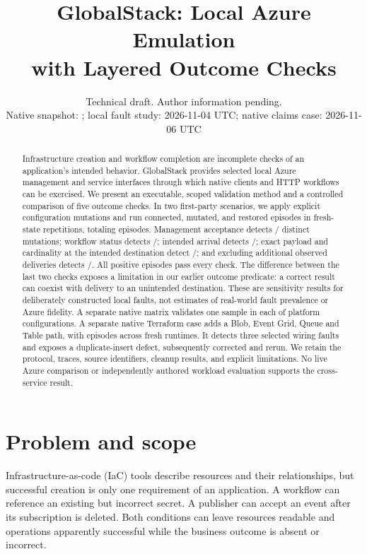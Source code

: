 \documentclass[10pt,a4paper]{article}
\title{\color{ink}GlobalStack: Local Azure Emulation\protect\\with Layered Outcome Checks}
\author{}
\date{Technical draft. Author information pending.\\Native snapshot: \SnapshotDate; local fault study: 2026-11-04 UTC; native claims case: 2026-11-06 UTC}
\begin{document}
\maketitle
\begin{abstract}
Infrastructure creation and workflow completion are incomplete checks of an application's intended behavior. GlobalStack provides selected local Azure management and service interfaces through which native clients and HTTP workflows can be exercised. We present an executable, scoped validation method and a controlled comparison of five outcome checks. In two first-party scenarios, we apply \StudyCases{} explicit configuration mutations and run connected, mutated, and restored episodes in \StudyRepetitions{} fresh-state repetitions, totaling \StudyEpisodes{} episodes. Management acceptance detects \StudyManagementCaught{}/\StudyCases{} distinct mutations; workflow status detects \StudyWorkflowCaught{}/\StudyCases{}; intended arrival detects \StudyArrivalCaught{}/\StudyCases{}; exact payload and cardinality at the intended destination detect \StudyExactCaught{}/\StudyCases{}; and excluding additional observed deliveries detects \StudyExclusiveCaught{}/\StudyCases{}. All \StudyPositives{} positive episodes pass every check. The difference between the last two checks exposes a limitation in our earlier outcome predicate: a correct result can coexist with delivery to an unintended destination. These are sensitivity results for deliberately constructed local faults, not estimates of real-world fault prevalence or Azure fidelity. A separate native matrix validates one sample in each of \NativeCount{} platform configurations. A separate native Terraform case adds a Blob, Event Grid, Queue and Table path, with \ClaimsEpisodes{} episodes across \ClaimsRepetitions{} fresh runtimes. It detects three selected wiring faults and exposes a duplicate-insert defect, subsequently corrected and rerun. We retain the protocol, traces, source identifiers, cleanup results, and explicit limitations. No live Azure comparison or independently authored workload evaluation supports the cross-service result.
\end{abstract}

\section{Problem and scope}
Infrastructure-as-code (IaC) tools describe resources and their relationships, but successful creation is only one requirement of an application. A workflow can reference an existing but incorrect secret. A publisher can accept an event after its subscription is deleted. Both conditions can leave resources readable and operations apparently successful while the business outcome is absent or incorrect.
\end{document}
